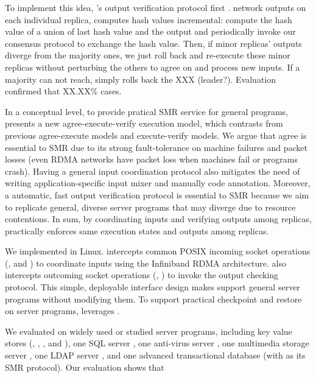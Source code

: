 To implement this idea, \xxx's output verification protocol first . network 
outputs on each individual replica, computes  hash values incremental:
compute the hash value of a union of last hash value and the output  and 
periodically invoke our \paxos consensus protocol to exchange the hash value. 
Then, if minor replicas' outputs diverge from the majority ones, we just roll 
back and re-execute these minor replicas without perturbing the others to agree 
on and process new inputs. If a majority can not reach, \xxx simply rolls back 
the XXX (leader?). Evaluation confirmed that XX.XX\% cases.


In a conceptual level, to provide pratical SMR service for general programs, 
\xxx presents a new agree-execute-verify execution model, which contrasts from 
previous agree-execute models and execute-verify models. We argue that agree is 
essential to SMR due to its strong fault-tolerance on machine failures and 
packet losses (even RDMA networks have packet loss when machines fail or 
programs crash). Having a general input coordination protocol also mitigates 
the need of writing application-specific input mixer and manually code 
annotation. Moreover, a automatic, fast output verification protocol is 
essential to SMR because we aim to replicate general, diverse server programs 
that may diverge due to resource contentions. In sum, by coordinating inputs 
and verifying outputs among replicas, \xxx practically enforces same execution 
states and outputs among replicas.

We implemented \xxx in Linux. \xxx intercepts common POSIX incoming socket 
operations (\eg, \accept and \recv) to coordinate inputs using the Infiniband 
RDMA architecture. \xxx also intercepts outcoming socket operations (\eg, 
\send) to invoke the output checking protocol. This simple, deployable 
interface design makes \xxx support general server programs without modifying 
them. To support practical checkpoint and restore on server 
programs, \xxx leverages \criu.

We evaluated \xxx on \nprog widely used or studied server programs, including 
\nkvprog key value stores (\redis, \memcached, \ssdb, and \mongodb), one SQL 
server \mysql, one anti-virus server \clamav, one multimedia storage server 
\mediatomb, one LDAP server \openldap, and one advanced transactional database 
\calvin (with \zookeeper as its SMR protocol). Our evaluation shows that

